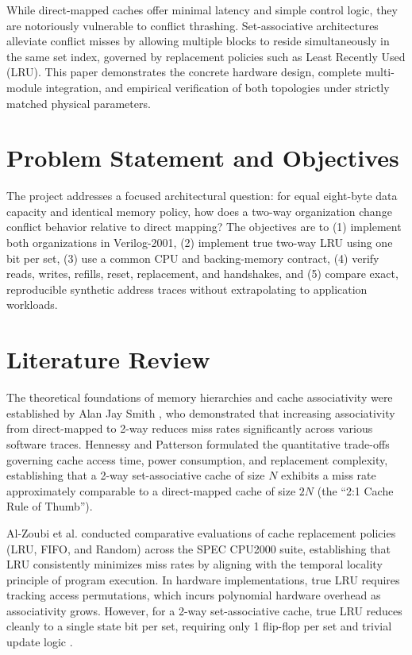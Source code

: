 \documentclass[10pt,twocolumn]{article}
\begin{document}
While direct-mapped caches offer minimal latency and simple control logic, they are notoriously vulnerable to conflict thrashing. Set-associative architectures alleviate conflict misses by allowing multiple blocks to reside simultaneously in the same set index, governed by replacement policies such as Least Recently Used (LRU). This paper demonstrates the concrete hardware design, complete multi-module integration, and empirical verification of both topologies under strictly matched physical parameters.

\section{Problem Statement and Objectives}
The project addresses a focused architectural question: for equal eight-byte data capacity and identical memory policy, how does a two-way organization change conflict behavior relative to direct mapping? The objectives are to (1) implement both organizations in Verilog-2001, (2) implement true two-way LRU using one bit per set, (3) use a common CPU and backing-memory contract, (4) verify reads, writes, refills, reset, replacement, and handshakes, and (5) compare exact, reproducible synthetic address traces without extrapolating to application workloads.

\section{Literature Review}
The theoretical foundations of memory hierarchies and cache associativity were established by Alan Jay Smith \cite{smith1982}, who demonstrated that increasing associativity from direct-mapped to 2-way reduces miss rates significantly across various software traces. Hennessy and Patterson \cite{hennessy2011} formulated the quantitative trade-offs governing cache access time, power consumption, and replacement complexity, establishing that a 2-way set-associative cache of size $N$ exhibits a miss rate approximately comparable to a direct-mapped cache of size $2N$ (the ``2:1 Cache Rule of Thumb'').

Al-Zoubi et al. \cite{alzoubi2004} conducted comparative evaluations of cache replacement policies (LRU, FIFO, and Random) across the SPEC CPU2000 suite, establishing that LRU consistently minimizes miss rates by aligning with the temporal locality principle of program execution. In hardware implementations, true LRU requires tracking access permutations, which incurs polynomial hardware overhead as associativity grows. However, for a 2-way set-associative cache, true LRU reduces cleanly to a single state bit per set, requiring only 1 flip-flop per set and trivial update logic \cite{ciletti2010}.
\end{document}
